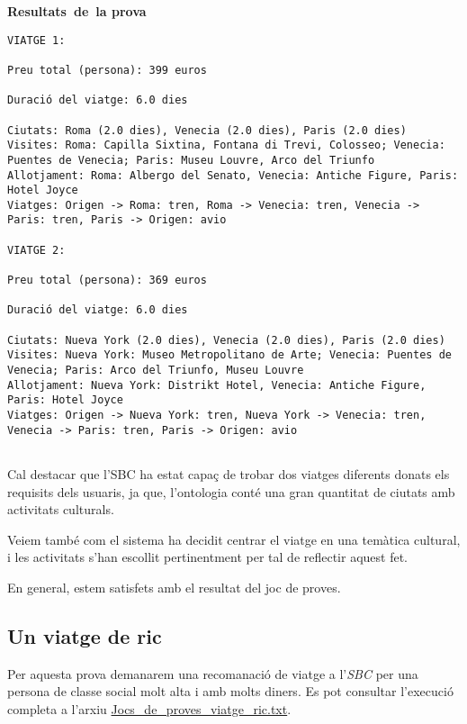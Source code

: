 \documentclass[11pt,a4paper]{article}
\begin{document}
\bigskip
\textbf{\mbox{Resultats de la} \mbox{prova}}\begin{lstlisting}
VIATGE 1:

Preu total (persona): 399 euros

Duració del viatge: 6.0 dies

Ciutats: Roma (2.0 dies), Venecia (2.0 dies), Paris (2.0 dies)
Visites: Roma: Capilla Sixtina, Fontana di Trevi, Colosseo; Venecia: Puentes de Venecia; Paris: Museu Louvre, Arco del Triunfo
Allotjament: Roma: Albergo del Senato, Venecia: Antiche Figure, Paris: Hotel Joyce
Viatges: Origen -> Roma: tren, Roma -> Venecia: tren, Venecia -> Paris: tren, Paris -> Origen: avio

VIATGE 2:

Preu total (persona): 369 euros

Duració del viatge: 6.0 dies

Ciutats: Nueva York (2.0 dies), Venecia (2.0 dies), Paris (2.0 dies)
Visites: Nueva York: Museo Metropolitano de Arte; Venecia: Puentes de Venecia; Paris: Arco del Triunfo, Museu Louvre
Allotjament: Nueva York: Distrikt Hotel, Venecia: Antiche Figure, Paris: Hotel Joyce
Viatges: Origen -> Nueva York: tren, Nueva York -> Venecia: tren, Venecia -> Paris: tren, Paris -> Origen: avio


\end{lstlisting}
\medskip

Cal destacar que l'SBC ha estat capaç de trobar dos viatges diferents donats els requisits dels usuaris, ja que, l'ontologia conté una gran quantitat de ciutats amb activitats culturals.

Veiem també com el sistema ha decidit centrar el viatge en una temàtica cultural, i les activitats s'han escollit pertinentment per tal de reflectir aquest fet.

En general, estem satisfets amb el resultat del joc de proves.

\subsection{Un viatge de ric}
Per aquesta prova demanarem una recomanació de viatge a l'\emph{SBC} per una persona de classe social molt alta i amb molts diners. Es pot consultar l'execució completa a l'arxiu \url{Jocs_de_proves_viatge_ric.txt}. \\
\end{document}
